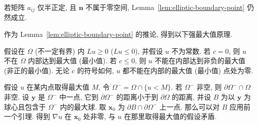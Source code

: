 \begin{Remark}
\label{rem:boundary-point-semidefinite}
若矩阵 $a_{ij}$ 仅半正定, 且 $\bm{n}$ 不属于零空间, Lemma~\ref{lem:elliptic-boundary-point} 仍然成立.
\end{Remark}

作为 Lemma~\ref{lem:elliptic-boundary-point} 的推论, 得到以下强最大值原理.

\begin{Theorem}
\label{thm:strong-maximum-principle}
假设在 $\Omega$ (不一定有界) 内 $Lu\geq0$ ($Lu\leq0$), 并假设 $u$ 不为常数. 若 $c=0$, 则 $u$ 不在 $\Omega$ 内部达到最大值 (最小值). 若 $c\leq0$, 则 $u$ 不能在内部达到非负的最大值 (非正的最小值). 无论 $c$ 的符号如何, $u$ 都不能在内部的最大值 (最小值) 点处为零.
\end{Theorem}

\begin{Proof}
假设 $u$ 在某内点取得最大值 $M$, 令 $\Omega^-=\Omega\cap\{u<M\}$. 若 $\Omega^-$ 非空, 则 $\partial\Omega^-\cap\Omega$ 非空. 设 $\bm{y}$ 是 $\Omega^-$ 中一点, 它到 $\partial\Omega^-$ 的距离小于到 $\partial\Omega$ 的距离, 并设 $B$ 为以 $\bm{y}$ 为球心且包含于 $\Omega^-$ 内的最大球. 取 $\bm{x}_0$ 为 $\partial B\cap\partial\Omega^-$ 上一点. 那么可以对 $B$ 应用前一个引理. 得到 $\nabla u$ 在 $\bm{x}_0$ 处非零, 与 $u$ 在那里取得最大值的假设矛盾.
\end{Proof}
